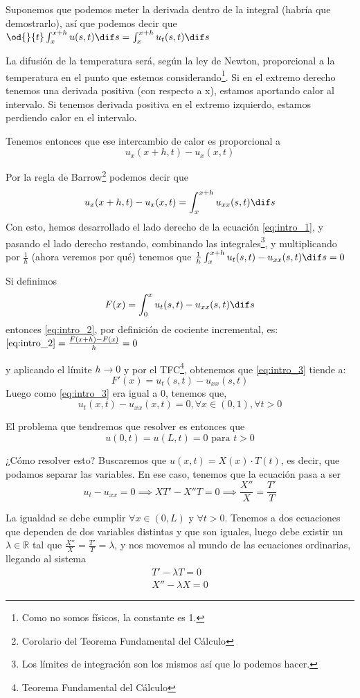 \documentclass[palatino]{apuntes}
\begin{document}
Suponemos que podemos meter la derivada dentro de la integral (habría que demostrarlo), así que podemos decir que \(  \od{}{t} \int_x^{x+h} u(s,t) \dif s = \int_x^{x+h} u_t(s,t) \dif s \label{eq:intro_1}\)

La difusión de la temperatura será, según la ley de Newton, proporcional a la temperatura en el punto que estemos considerando\footnote{Como no somos físicos, la constante es 1.}. Si en el extremo derecho tenemos una derivada positiva (con respecto a x), estamos aportando calor al intervalo. Si tenemos derivada positiva en el extremo izquierdo, estamos perdiendo calor en el intervalo.

Tenemos entonces que ese intercambio de calor es proporcional a \[u_x(x+h, t) - u_x(x,t)\]

Por la regla de Barrow\footnote{Corolario del Teorema Fundamental del Cálculo} podemos decir que \[ u_x(x+h, t) - u_x(x,t) = \int_x^{x+h} u_{xx}(s,t) \dif s\]
Con esto, hemos desarrollado el lado derecho de la ecuación \ref{eq:intro_1}, y pasando el lado derecho restando, combinando las integrales\footnote{Los límites de integración son los mismos así que lo podemos hacer.}, y multiplicando por $\frac{1}{h}$ (ahora veremos por qué) tenemos que
\( \frac{1}{h} \int_{x}^{x+h} u_t(s,t) - u_{xx}(s,t) \dif s = 0 \label{eq:intro_2}\)

Si definimos $$F(x) = \int_{0}^{x} u_t(s,t) - u_{xx}(s,t) \dif s $$ entonces \ref{eq:intro_2}, por definición de cociente incremental, es:
\( \ref{eq:intro_2} = \frac{F(x+h) - F(x)}{h} = 0  \label{eq:intro_3}\)

y aplicando el límite $h \to 0$ y por el TFC\footnote{Teorema Fundamental del Cálculo}, obtenemos que \ref{eq:intro_3} tiende a:
\[ F'(x) = u_t(s,t) - u_{xx}(s,t) \]
Luego como \ref{eq:intro_3} era igual a 0, tenemos que,
\[ u_t(x,t) - u_{xx} (x,t) = 0, \forall x \in (0,1), \forall t > 0\]

El problema que tendremos que resolver es entonces que
$$u(0,t) = u(L,t) = 0 \text{ para } t > 0$$

¿Cómo resolver esto? Buscaremos que $u(x,t) = X(x) · T(t)$, es decir, que podamos separar las variables. En ese caso, tenemos que la ecuación pasa a ser \[ u_t - u_{xx} = 0 \implies XT' - X''T = 0 \implies \frac{X''}{X} = \frac{T'}{T} \]

La igualdad se debe cumplir $∀x ∈ (0,L)$ y $∀t > 0$. Tenemos a dos ecuaciones que dependen de dos variables distintas y que son iguales, luego debe existir un $λ ∈ ℝ$ tal que $\frac{X''}{X} = \frac{T'}{T} = λ$, y nos movemos al mundo de las ecuaciones ordinarias, llegando al sistema  \[ \begin{matrix} T' - λT = 0 \\ X'' - λX = 0 \end{matrix}\]
\end{document}
